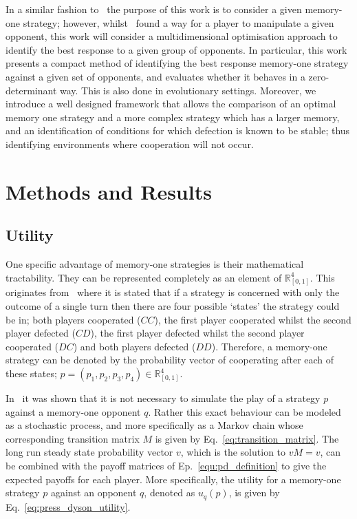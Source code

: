 \documentclass[9pt,twocolumn,twoside,lineno]{pnas-new}
\newcommand{\R}{\mathbb{R}}
\begin{document}
In a similar fashion to~\cite{Press2012} the purpose of this work is to consider
a given memory-one strategy; however, whilst~\cite{Press2012} found a way for a
player to manipulate a given opponent, this work will consider a
multidimensional optimisation approach to identify the best response to a given
group of opponents. In particular, this work presents a compact method of
identifying the best response memory-one strategy against a given set of
opponents, and evaluates whether it behaves in a
zero-determinant way. This is also done in evolutionary settings. Moreover, we
introduce a well designed framework that allows the comparison of an optimal
memory one strategy and a more complex strategy which has a larger memory, and an
identification of conditions for which defection is known to be stable; thus
identifying environments where cooperation will not occur.

\section*{Methods and Results}
\subsection*{Utility}

One specific advantage of memory-one strategies is their mathematical
tractability. They can be represented completely as an element of \(\R^{4}_{[0, 1]}\). This
originates from~\cite{Nowak1989} where it is stated that if a strategy is
concerned with only the outcome of a single turn then there are four possible
`states' the strategy could be in; both players cooperated (\(CC\)), 
the first player cooperated whilst the second player defected (\(CD\)),
the first player defected whilst the second player cooperated (\(DC\)) and
both players defected (\(DD\)).
Therefore, a memory-one strategy can be denoted by the probability vector of
cooperating after each of these states; \(p=(p_1, p_2, p_3, p_4) \in \R_{[0,1]}
^ 4\).

In~\cite{Nowak1989} it was shown that it is not necessary to simulate the play
of a strategy $p$ against a memory-one opponent $q$. Rather this exact behaviour
can be modeled as a stochastic process, and more specifically as a Markov chain
whose corresponding transition matrix \(M\) is
given by Eq.~\ref{eq:transition_matrix}. The long run steady state probability
vector \(v\), which is the solution to \(v M = v\), can be
combined with the payoff matrices of Ep.~\ref{equ:pd_definition} to give the expected
payoffs for each player. More specifically, the utility for a memory-one
strategy \(p\) against an opponent \(q\), denoted as \(u_q(p)\), is given by
Eq.~\ref{eq:press_dyson_utility}.
\end{document}
